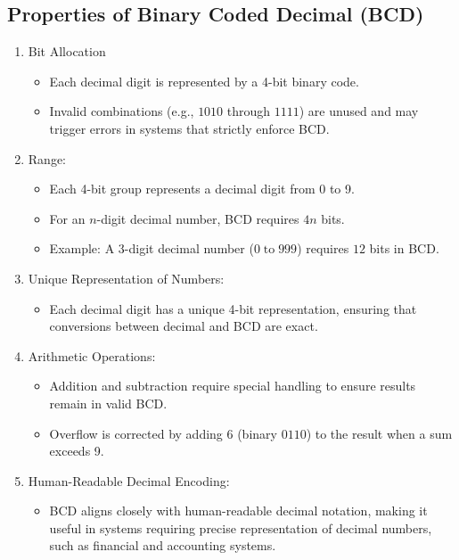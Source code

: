 \subsection{Properties of Binary Coded Decimal (BCD)}
\begin{enumerate}
    \item Bit Allocation
    \begin{itemize}
        \item Each decimal digit is represented by a 4-bit binary code.
        \item Invalid combinations (e.g., \( 1010 \) through \( 1111 \)) are unused and may trigger errors in systems that strictly enforce BCD.
    \end{itemize}

    \item Range:
    \begin{itemize}
        \item Each 4-bit group represents a decimal digit from 0 to 9.
        \item For an \( n \)-digit decimal number, BCD requires \( 4n \) bits.
        \item Example: A 3-digit decimal number (\( 0 \; \text{to} \; 999 \)) requires \( 12 \) bits in BCD.
    \end{itemize}

    \item Unique Representation of Numbers:
    \begin{itemize}
        \item Each decimal digit has a unique 4-bit representation, ensuring that conversions between decimal and BCD are exact.
    \end{itemize}

    \item Arithmetic Operations:
    \begin{itemize}
        \item Addition and subtraction require special handling to ensure results remain in valid BCD.
        \item Overflow is corrected by adding \( 6 \) (binary \( 0110 \)) to the result when a sum exceeds 9.
    \end{itemize}

    \item Human-Readable Decimal Encoding:
    \begin{itemize}
        \item BCD aligns closely with human-readable decimal notation, making it useful in systems requiring precise representation of decimal numbers, such as financial and accounting systems.
    \end{itemize}
\end{enumerate}

